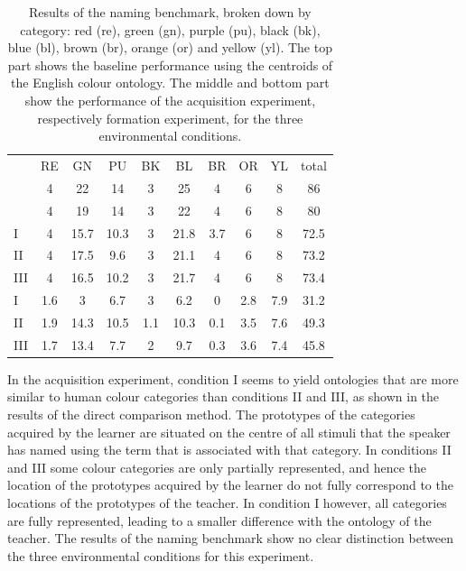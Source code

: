 \begin{table}[htbp]
  \centering
  \begin{tabular}{lccccccccc}
    & RE & GN & PU & BK & BL & BR & OR & YL & total \\
    & 4 & 22 & 14 & 3 & 25 & 4 & 6 & 8 & 86 \\
    \hline
    & 4 & 19 & 14 & 3 & 22 & 4 & 6 & 8 & 80 \\ 
    \hline
    I & 4 & 15.7 & 10.3 & 3 & 21.8 & 3.7 & 6 & 8 & 72.5 \\
    II & 4 & 17.5 & 9.6 & 3 & 21.1 & 4 & 6 & 8 & 73.2 \\
    III & 4 & 16.5 & 10.2 & 3 & 21.7 & 4 & 6 & 8 & 73.4 \\
    \hline
    I & 1.6 & 3 & 6.7 & 3 & 6.2 & 0 & 2.8 & 7.9 & 31.2 \\
    II & 1.9 & 14.3 & 10.5 & 1.1 & 10.3 & 0.1 & 3.5 & 7.6 & 49.3 \\
    III & 1.7 & 13.4 & 7.7 & 2 & 9.7 & 0.3 & 3.6 & 7.4 & 45.8 \\
    \hline
  \end{tabular}
  \caption[Naming benchmark of formed grounded colour category systems
  for the consensus chips in English]{Results of the naming benchmark,
    broken down by category: red (re), green (gn), purple (pu), black
    (bk), blue (bl), brown (br), orange (or) and yellow (yl).  The top
    part shows the baseline performance using the centroids of the
    English colour ontology. The middle and bottom part show the
    performance of the acquisition experiment, respectively formation
    experiment, for the three environmental conditions.}
  \label{t:benchmark}
\end{table}

In the acquisition experiment, condition I seems to yield ontologies
that are more similar to human colour categories than conditions II
and III, as shown in the results of the direct comparison method. The
prototypes of the categories acquired by the learner are situated on
the centre of all stimuli that the speaker has named using the term
that is associated with that category. In conditions II and III some
colour categories are only partially represented, and hence the
location of the prototypes acquired by the learner do not fully
correspond to the locations of the prototypes of the teacher. In
condition I however, all categories are fully represented, leading to
a smaller difference with the ontology of the teacher. The results of
the naming benchmark show no clear distinction between the three
environmental conditions for this experiment.

